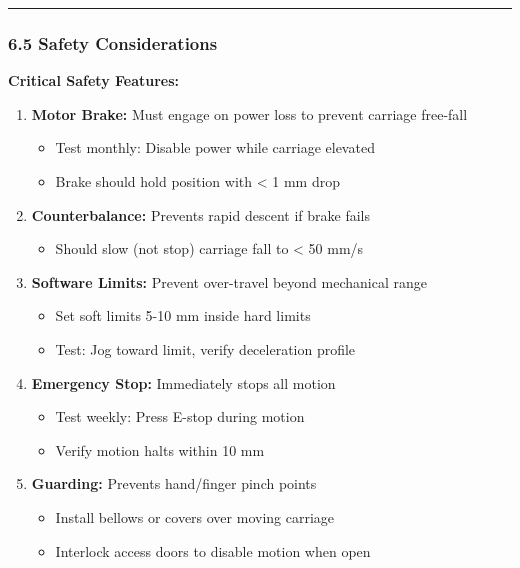 \documentclass[
]{article}
\providecommand{\tightlist}{%
  \setlength{\itemsep}{0pt}\setlength{\parskip}{0pt}}
\begin{document}
\begin{center}\rule{0.5\linewidth}{0.5pt}\end{center}

\subsubsection{6.5 Safety Considerations}\label{safety-considerations-1}

\textbf{Critical Safety Features:}

\begin{enumerate}
\def\labelenumi{\arabic{enumi}.}
\tightlist
\item
  \textbf{Motor Brake:} Must engage on power loss to prevent carriage
  free-fall

  \begin{itemize}
  \tightlist
  \item
    Test monthly: Disable power while carriage elevated
  \item
    Brake should hold position with \textless{} 1 mm drop
  \end{itemize}
\item
  \textbf{Counterbalance:} Prevents rapid descent if brake fails

  \begin{itemize}
  \tightlist
  \item
    Should slow (not stop) carriage fall to \textless{} 50 mm/s
  \end{itemize}
\item
  \textbf{Software Limits:} Prevent over-travel beyond mechanical range

  \begin{itemize}
  \tightlist
  \item
    Set soft limits 5-10 mm inside hard limits
  \item
    Test: Jog toward limit, verify deceleration profile
  \end{itemize}
\item
  \textbf{Emergency Stop:} Immediately stops all motion

  \begin{itemize}
  \tightlist
  \item
    Test weekly: Press E-stop during motion
  \item
    Verify motion halts within 10 mm
  \end{itemize}
\item
  \textbf{Guarding:} Prevents hand/finger pinch points

  \begin{itemize}
  \tightlist
  \item
    Install bellows or covers over moving carriage
  \item
    Interlock access doors to disable motion when open
  \end{itemize}
\end{enumerate}
\end{document}
